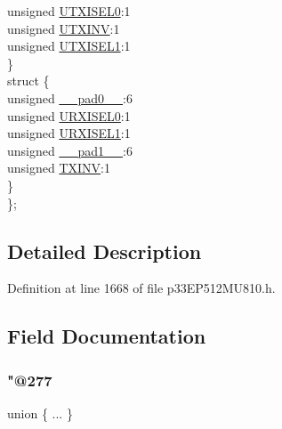 \begin{DoxyCompactItemize}
\begin{tabbing}
\>\>unsigned \hyperlink{structtag_u1_s_t_a_b_i_t_s_aaff1f97a591df18ff20cf189a2944089}{UTXISEL0}:1\\
\>\>unsigned \hyperlink{structtag_u1_s_t_a_b_i_t_s_a08dde9c5ebe6558bfae4ea659190ddb6}{UTXINV}:1\\
\>\>unsigned \hyperlink{structtag_u1_s_t_a_b_i_t_s_af7ce0d24148cffc8fc3d8abccf37ea9f}{UTXISEL1}:1\\
\>\} \\
\>struct \{\\
\>\>unsigned \hyperlink{structtag_u1_s_t_a_b_i_t_s_adf71f3d8410c1f1dbbc96680a92c49af}{\_\_pad0\_\_}:6\\
\>\>unsigned \hyperlink{structtag_u1_s_t_a_b_i_t_s_af79a21216ad16ee2c61e03f238f42e6a}{URXISEL0}:1\\
\>\>unsigned \hyperlink{structtag_u1_s_t_a_b_i_t_s_a18f8693c16d1aaec33bf9058dc1ea2d2}{URXISEL1}:1\\
\>\>unsigned \hyperlink{structtag_u1_s_t_a_b_i_t_s_acaf2d0924a107ec6e8d2e31febaf66f9}{\_\_pad1\_\_}:6\\
\>\>unsigned \hyperlink{structtag_u1_s_t_a_b_i_t_s_a2baa3dcc3e10cb6a9f3fce197d05376b}{TXINV}:1\\
\>\} \\
\}; \\

\end{tabbing}\end{DoxyCompactItemize}


\subsection{Detailed Description}


Definition at line 1668 of file p33\+E\+P512\+M\+U810.\+h.



\subsection{Field Documentation}
\mbox{\label{structtag_u1_s_t_a_b_i_t_s_afad223eb595b71b815fd4ba72fc83b36}} 
\subsubsection{\texorpdfstring{"@277}{@277}}
{\footnotesize\ttfamily union \{ ... \} }

\mbox{\label{structtag_u1_s_t_a_b_i_t_s_adf71f3d8410c1f1dbbc96680a92c49af}} 
